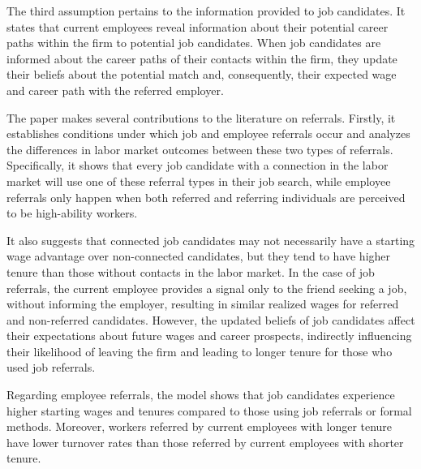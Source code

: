 \documentclass[12pt]{article}
\begin{document}

The third assumption pertains to the information provided to job candidates. It states that current employees reveal information about their potential career paths within the firm to potential job candidates. When job candidates are informed about the career paths of their contacts within the firm, they update their beliefs about the potential match and, consequently, their expected wage and career path with the referred employer.

The paper makes several contributions to the literature on referrals. Firstly, it establishes conditions under which job and employee referrals occur and analyzes the differences in labor market outcomes between these two types of referrals. Specifically, it shows that every job candidate with a connection in the labor market will use one of these referral types in their job search, while employee referrals only happen when both referred and referring individuals are perceived to be high-ability workers.

It also suggests that connected job candidates may not necessarily have a starting wage advantage over non-connected candidates, but they tend to have higher tenure than those without contacts in the labor market. In the case of job referrals, the current employee provides a signal only to the friend seeking a job, without informing the employer, resulting in similar realized wages for referred and non-referred candidates. However, the updated beliefs of job candidates affect their expectations about future wages and career prospects, indirectly influencing their likelihood of leaving the firm and leading to longer tenure for those who used job referrals.

Regarding employee referrals, the model shows that job candidates experience higher starting wages and tenures compared to those using job referrals or formal methods. Moreover, workers referred by current employees with longer tenure have lower turnover rates than those referred by current employees with shorter tenure.
\end{document}
